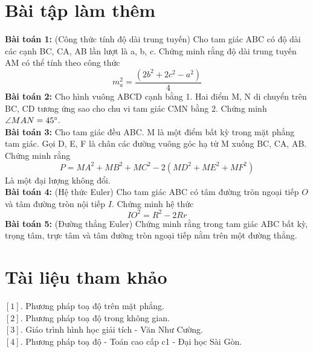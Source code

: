 \documentclass[12pt,a4]{article}
\begin{document}
\begin{titlepage}
\section{Bài tập làm thêm}
\textbf{Bài toán 1:} (Công thức tính độ dài trung tuyến) Cho tam giác ABC có độ dài các cạnh BC, CA, AB lần lượt là a, b, c. Chứng minh rằng độ dài trung tuyến AM có thể tính theo công thức
\[
m_a^2 = \frac{(2b^2 + 2c^2 - a^2)}{4}
\]
\textbf{Bài toán 2:} Cho hình vuông ABCD cạnh bằng 1. Hai điểm M, N di chuyển trên BC, CD tương ứng sao cho chu vi tam giác CMN bằng 2. Chứng minh $\angle MAN = 45 \degree. $\\
\textbf{Bài toán 3:} Cho tam giác đều ABC. M là một điểm bất kỳ trong mặt phẳng tam giác. Gọi D, E, F là chân các đường vuông góc hạ từ M xuống BC, CA, AB. Chứng minh rằng\
\[
P = MA^2 + MB^2 + MC^2 - 2(MD^2 + ME^2 + MF^2)
\]
Là một đại lượng không đổi.\\
\textbf{Bài toán 4:} (Hệ thức Euler) Cho tam giác ABC có tâm đường tròn ngoại tiếp $O$ và tâm đường tròn nội tiếp $I$. Chứng minh hệ thức
\[
IO^2 = R^2 - 2Rr
\]
\textbf{Bài toán 5:} (Đường thẳng Euler) Chứng minh rằng trong tam giác ABC bất kỳ, trọng tâm, trực tâm và tâm đường tròn ngoại tiếp nằm trên một đường thẳng.
\section{Tài liệu tham khảo}
$[1]$. Phương pháp toạ độ trên mặt phẳng.\\
$[2]$. Phương pháp toạ độ trong không gian.\\
$[3]$. Giáo trình hình học giải tích - Văn Như Cường.\\
$[4]$. Phương pháp toạ độ - Toán cao cấp c1 - Đại học Sài Gòn.\\
\end{titlepage}
\end{document}
